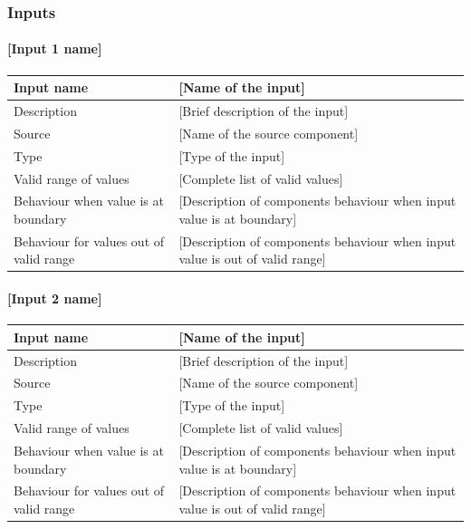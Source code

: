 \subsubsection{Inputs}\label{s:manage_radio_communication_inputs}

\paragraph{[Input 1 name]}

\begin{longtable}{p{}p{}}
\toprule
Input name				& [Name of the input] \\
\midrule
Description				& [Brief description of the input] \\
\midrule
Source					& [Name of the source component] \\ 
\midrule
Type					& [Type of the input] \\
\midrule
Valid range of values	& [Complete list of valid values] \\
\midrule
Behaviour when value is at boundary	& [Description of components behaviour when input value is at boundary] \\
\midrule
Behaviour for values out of valid range	& [Description of components behaviour when input value is out of valid range] \\
\bottomrule
\end{longtable}


\paragraph{[Input 2 name]}

\begin{longtable}{p{}p{}}
\toprule
Input name				& [Name of the input] \\
\midrule
Description				& [Brief description of the input] \\
\midrule
Source					& [Name of the source component] \\ 
\midrule
Type					& [Type of the input] \\
\midrule
Valid range of values	& [Complete list of valid values] \\
\midrule
Behaviour when value is at boundary	& [Description of components behaviour when input value is at boundary] \\
\midrule
Behaviour for values out of valid range	& [Description of components behaviour when input value is out of valid range] \\
\bottomrule
\end{longtable}


